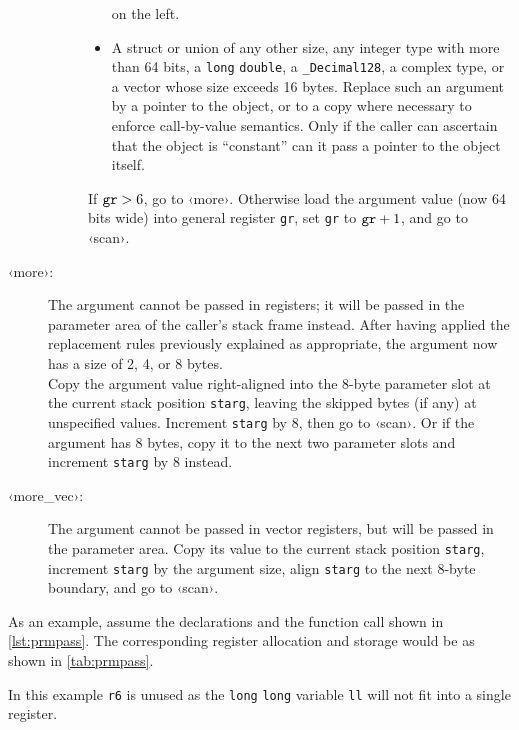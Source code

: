 \documentclass[USenglish,fontsize=11pt,twoside,%
  toc=bib,toc=idx,toc=graduated,numbers=noendperiod,
  bookmarks=true,
  bookmarksnumbered=true,
  bookmarksopen=true,
  bookmarksopenlevel=1,
  breaklinks=true,
  colorlinks=true,
  linkcolor=black,
  pdfpagelayout={TwoPageRight},
  pdfusetitle=true
]{scrreprt}
\newcommand{\jumplabel}[1]{\textsf{‹#1›}}
\newcommand{\NBITS}{64}
\newcommand{\NBYTES}{8}
\newcommand{\NBITS}{32}
\newcommand{\NBYTES}{4}
\begin{document}
\begin{description}
\begin{description}
\begin{itemize}
      on the left.
    \item A struct or union of any other size, any integer type with more
      than \NBITS{} bits, a \texttt{long} \texttt{double}, a
      \texttt{\_Decimal128}, a complex type, or a vector whose size
      exceeds 16 bytes.  Replace such an argument by a pointer to the
      object, or to a copy where necessary to enforce call-by-value
      semantics.  Only if the caller can ascertain that the object is
      ``constant'' can it pass a pointer to the object itself.
    \end{itemize}
    If $\mbox{\texttt{gr}}>6$, go to \jumplabel{more}.  Otherwise load the
    argument value (now \NBITS{} bits wide) into general register
    \texttt{gr}, set \texttt{gr} to $\mbox{\texttt{gr}}+1$, and go to
    \jumplabel{scan}.
  \end{description}
\item[\jumplabel{more}:] The argument cannot be passed in registers; it
  will be passed in the parameter area of the caller's stack frame
  instead.  After having applied the replacement rules previously
  explained as appropriate, the argument now has a size of 2, 4, or 8
  bytes.
  \\
  Copy the argument value right-aligned into the \NBYTES{}-byte parameter
  slot at the current stack position \texttt{starg}, leaving the skipped
  bytes (if any) at unspecified values.  Increment \texttt{starg} by
  \NBYTES{}, then go to \jumplabel{scan}.
  \ifzseries\else Or if the argument has 8 bytes, copy it to the next two
    parameter slots and increment \texttt{starg} by 8 instead.\fi
\item[\jumplabel{more\_vec}:] The argument cannot be passed in vector
  registers, but will be passed in the parameter area.  Copy its value to
  the current stack position \texttt{starg}, increment \texttt{starg} by
  the argument size, align \texttt{starg} to the next \NBYTES{}-byte
  boundary, and go to \jumplabel{scan}.
\end{description}

As an example, assume the declarations and the function call shown in
\cref{lst:prmpass}.  The corresponding register allocation and
storage would be as shown in \cref{tab:prmpass}.

\ifzseries\else In this example \texttt{r6} is unused as the \texttt{long}
\texttt{long} variable \texttt{ll} will not fit into a single register.\fi
\end{document}
